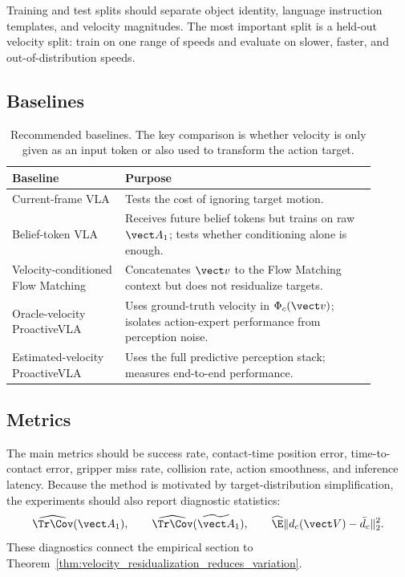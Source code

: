 \documentclass{article} %
\begin{document}
Training and test splits should separate object identity, language instruction templates, and velocity magnitudes. The most important split is a held-out velocity split: train on one range of speeds and evaluate on slower, faster, and out-of-distribution speeds.

\subsection{Baselines}

\begin{table}[H]
\centering
\caption{Recommended baselines. The key comparison is whether velocity is only given as an input token or also used to transform the action target.}
\label{tab:baselines}
\begin{tabular}{@{}>{\raggedright\arraybackslash}p{0.28\linewidth}>{\raggedright\arraybackslash}p{0.62\linewidth}@{}}
\toprule
Baseline & Purpose \\
\midrule
Current-frame VLA & Tests the cost of ignoring target motion. \\
Belief-token VLA & Receives future belief tokens but trains on raw $\vect A_1$; tests whether conditioning alone is enough. \\
Velocity-conditioned Flow Matching & Concatenates $\vect v$ to the Flow Matching context but does not residualize targets. \\
Oracle-velocity ProactiveVLA & Uses ground-truth velocity in $\Phi_c(\vect v)$; isolates action-expert performance from perception noise. \\
Estimated-velocity ProactiveVLA & Uses the full predictive perception stack; measures end-to-end performance. \\
\bottomrule
\end{tabular}
\end{table}

\subsection{Metrics}

The main metrics should be success rate, contact-time position error, time-to-contact error, gripper miss rate, collision rate, action smoothness, and inference latency. Because the method is motivated by target-distribution simplification, the experiments should also report diagnostic statistics:
\begin{equation}
    \widehat{\Tr\Cov}(\vect A_1),
    \qquad
    \widehat{\Tr\Cov}(\widetilde{\vect A}_1),
    \qquad
    \widehat{\E}\|d_c(\vect V)-\bar d_c\|_2^2.
    \label{eq:empirical_diagnostics}
\end{equation}
These diagnostics connect the empirical section to Theorem~\ref{thm:velocity_residualization_reduces_variation}.
\end{document}
